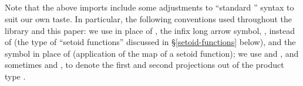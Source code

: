 \begin{code}%
\>[0]\<%
\\
\>[0]%
\>[13]%
\>[52]\AgdaSpace{}%
\<%
\\
\>[0]%
\>[13]%
\>[52]\AgdaSpace{}%
\<%
\\
\>[0]%
\>[13]%
\>[52]\AgdaSpace{}%
\<%
\\
%
\\[\AgdaEmptyExtraSkip]%
\>[0]\AgdaSpace{}%
\<%
\\
\>[0][@{}l@{\AgdaIndent{0}}]%
\>[1]\AgdaSpace{}%
\AgdaSpace{}%
\AgdaSpace{}%
\AgdaSpace{}%
\AgdaSpace{}%
\AgdaSpace{}%
\AgdaSpace{}%
\AgdaSpace{}%
\AgdaSpace{}%
\AgdaSpace{}%
\AgdaSpace{}%
\AgdaSymbol{:}\AgdaSpace{}%
\<%
\\
%
\>[1]\AgdaSpace{}%
\AgdaSpace{}%
\AgdaSymbol{:}\AgdaSpace{}%
\AgdaSpace{}%
\<%
\\
%
\>[1]\AgdaSpace{}%
\AgdaSymbol{:}\AgdaSpace{}%
\AgdaSpace{}%
\<%
\\
\>[0]\<%
\end{code}
\fi
Note that the above imports include some adjustments to ``standard \agda'' syntax to suit our own taste.
In particular, the following conventions used throughout the \agdaalgebras library and this paper: we use  in place of , the infix long arrow symbol,
, instead of  (the type of ``setoid functions'' discussed in §\ref{setoid-functions} below), and the symbol  in place of  (application of the map of a setoid function); we use
 and , and sometimes  and
, to denote the first and second
projections out of the product type
.
\ifshort\else


